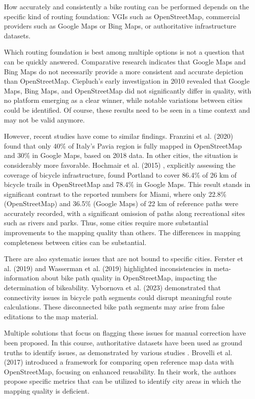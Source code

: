 How accurately and consistently a bike routing can be performed depends on the specific kind of routing foundation: VGIs such as OpenStreetMap, commercial providers such as Google Maps or Bing Maps, or authoritative infrastructure datasets.

Which routing foundation is best among multiple options is not a question that can be quickly answered. Comparative research indicates that Google Maps and Bing Maps do not necessarily provide a more consistent and accurate depiction than OpenStreetMap. Ciepluch's early investigation in 2010 \cite{ciepluch_comparison_2010} revealed that Google Maps, Bing Maps, and OpenStreetMap did not significantly differ in quality, with no platform emerging as a clear winner, while notable variations between cities could be identified. Of course, these results need to be seen in a time context and may not be valid anymore. 

However, recent studies have come to similar findings. Franzini et al. (2020) \cite{franzini_assessment_2020} found that only 40\% of Italy's Pavia region is fully mapped in OpenStreetMap and 30\% in Google Maps, based on 2018 data. In other cities, the situation is considerably more favorable. Hochmair et al. (2015) \cite{hochmair_assessing_2015}, explicitly assessing the coverage of bicycle infrastructure, found Portland to cover 86.4\% of 26 km of bicycle trails in OpenStreetMap and 78.4\% in Google Maps. This result stands in significant contrast to the reported numbers for Miami, where only 22.8\% (OpenStreetMap) and 36.5\% (Google Maps) of 22 km of reference paths were accurately recorded, with a significant omission of paths along recreational sites such as rivers and parks. Thus, some cities require more substantial improvements to the mapping quality than others. The differences in mapping completeness between cities can be substantial.

There are also systematic issues that are not bound to specific cities. Ferster et al. (2019) \cite{ferster_using_2019} and Wasserman et al. (2019) \cite{wasserman_evaluating_2019} highlighted inconsistencies in meta-information about bike path quality in OpenStreetMap, impacting the determination of bikeability. Vybornova et al. (2023) \cite{vybornova_automated_2023} demonstrated that connectivity issues in bicycle path segments could disrupt meaningful route calculations. These disconnected bike path segments may arise from false editations to the map material.

Multiple solutions that focus on flagging these issues for manual correction have been proposed. In this course, authoritative datasets have been used as ground truths to identify issues, as demonstrated by various studies \cite{haklay_how_2010, jokar_arsanjani_quality_2015, ludwig_comparison_2011}. Brovelli et al. (2017) \cite{brovelli_towards_2017} introduced a framework for comparing open reference map data with OpenStreetMap, focusing on enhanced reusability. In their work, the authors propose specific metrics that can be utilized to identify city areas in which the mapping quality is deficient.

